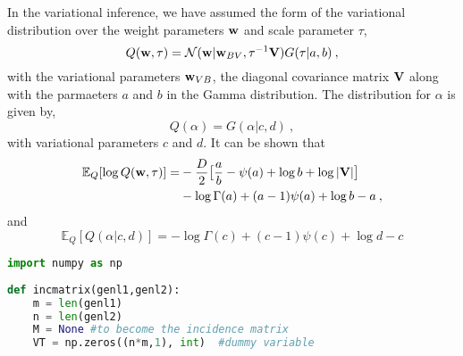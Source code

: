 \documentclass[letter,11pt]{article}
\begin{document}
In the variational inference, we have assumed the form of the variational distribution over the weight parameters ${\bf w}$ and scale parameter $\tau$,
\begin{equation}
	Q({\bf w},\tau) = \mathcal N({\bf w}|{\bf w}_{BV}, \tau^{-1}{\bf V})
	G(\tau|a, b)\:,
\end{equation} with the variational parameters ${\bf w}_{VB}$, the diagonal covariance matrix ${\bf V}$ along with the parmaeters $a$ and $b$ in the Gamma distribution. The distribution for $\alpha$ is given by,
\begin{equation}
	Q(\alpha) = G(\alpha|c, d)\:, 
\end{equation} with variational parameters $c$ and $d$. It can be shown that
\begin{equation}
\begin{split}
	\mathbb E_Q[\log Q({\bf w},\tau)] = &-\frac{D}{2}\big[
	\frac{a}{b} - \psi(a) + \log b + \log |{\bf V}|
	\big]\\
	&-\log\Gamma(a) + (a-1)\psi(a) + \log b - a\:,
\end{split}
\end{equation} and
\begin{equation}
	\mathbb E_Q[Q(\alpha|c,d)]= -\log\Gamma(c) + (c-1)\psi(c) + \log d - c
\end{equation}

%

\begin{lstlisting}[language=Python, caption=Python example]
import numpy as np
    
def incmatrix(genl1,genl2):
    m = len(genl1)
    n = len(genl2)
    M = None #to become the incidence matrix
    VT = np.zeros((n*m,1), int)  #dummy variable

\end{lstlisting}
\end{document}
